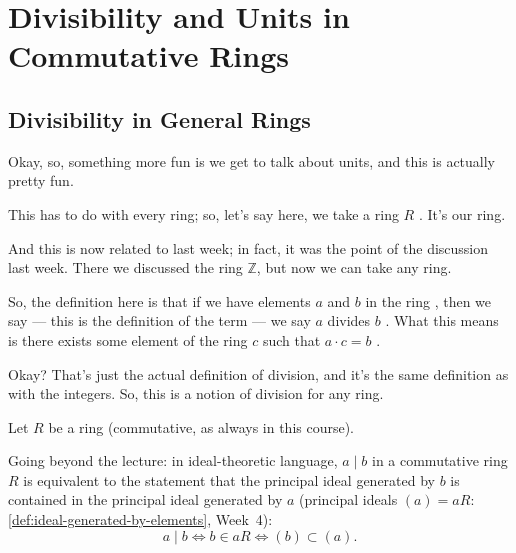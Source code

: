 \section{Divisibility and Units in Commutative Rings}

\subsection{Divisibility in General Rings}

\begin{speech}[00:23:18 - 00:24:29]
Okay, so, something more fun is we get to talk about units, and this is actually pretty fun.

This has to do with every ring; so, let's say here, we take a ring $R$ . It's our ring.

And this is now related to last week; in fact, it was the point of the discussion last week. There we discussed the ring $\mathbb{Z}$, but now we can take any ring.

So, the definition here is that if we have elements $a$ and $b$ in the ring , then we say --- this is the definition of the term --- we say $a$ divides $b$ . What this means is there exists some element of the ring $c$ such that $a \cdot c = b$ .

Okay? That's just the actual definition of division, and it's the same definition as with the integers. So, this is a notion of division for any ring.
\end{speech}

\begin{content}
Let $R$ be a ring (commutative, as always in this course).


\begin{steps}
Going beyond the lecture: in ideal-theoretic language, $a \mid b$ in a commutative ring $R$ is equivalent to the statement that the principal ideal generated by $b$ is contained in the principal ideal generated by $a$ (principal ideals $(a) = aR$: \cref{def:ideal-generated-by-elements}, Week~4):
\[
a \mid b \iff b \in aR \iff (b) \subset (a).
\]
\end{steps}
\end{content}

